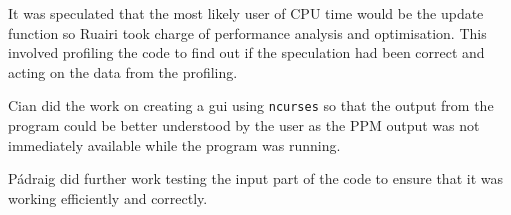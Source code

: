 It was speculated that the most likely user of CPU time would be the update function so Ruairi took charge of performance analysis and optimisation.
This involved profiling the code to find out if the speculation had been correct and acting on the data from the profiling.

Cian did the work on creating a gui using \texttt{ncurses} so that the output from the program could be better understood by the user as the PPM output was not immediately available while the program was running.

P\'{a}draig did further work testing the input part of the code to ensure that it was working efficiently and correctly.

